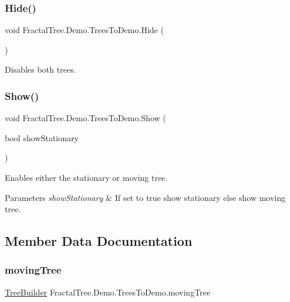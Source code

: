 \subsubsection{\texorpdfstring{Hide()}{Hide()}}
{\footnotesize\ttfamily void Fractal\+Tree.\+Demo.\+Trees\+To\+Demo.\+Hide (\begin{DoxyParamCaption}{ }\end{DoxyParamCaption})}



Disables both trees. 

\mbox{\label{class_fractal_tree_1_1_demo_1_1_trees_to_demo_abe09f9d37ec9b04f06abd2bef66aed72}} 
\subsubsection{\texorpdfstring{Show()}{Show()}}
{\footnotesize\ttfamily void Fractal\+Tree.\+Demo.\+Trees\+To\+Demo.\+Show (\begin{DoxyParamCaption}\item[{bool}]{show\+Stationary }\end{DoxyParamCaption})}



Enables either the stationary or moving tree. 


\begin{DoxyParams}{Parameters}
{\em show\+Stationary} & If set to {\ttfamily true} show stationary else show moving tree.\\
\hline
\end{DoxyParams}


\subsection{Member Data Documentation}
\mbox{\label{class_fractal_tree_1_1_demo_1_1_trees_to_demo_a8ebc7052928d860fd758a5ecfbff5710}} 
\subsubsection{\texorpdfstring{moving\+Tree}{movingTree}}
{\footnotesize\ttfamily \hyperlink{class_fractal_tree_1_1_tree_builder}{Tree\+Builder} Fractal\+Tree.\+Demo.\+Trees\+To\+Demo.\+moving\+Tree}



